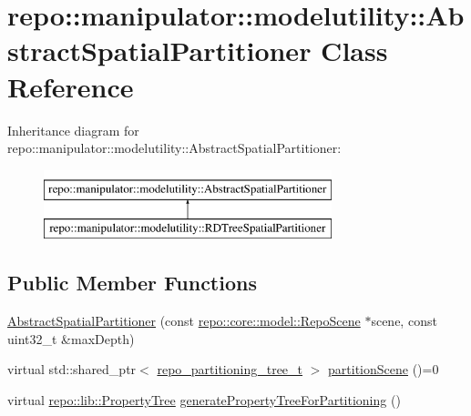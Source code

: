 \hypertarget{classrepo_1_1manipulator_1_1modelutility_1_1_abstract_spatial_partitioner}{}\section{repo\+:\+:manipulator\+:\+:modelutility\+:\+:Abstract\+Spatial\+Partitioner Class Reference}
\label{classrepo_1_1manipulator_1_1modelutility_1_1_abstract_spatial_partitioner}
Inheritance diagram for repo\+:\+:manipulator\+:\+:modelutility\+:\+:Abstract\+Spatial\+Partitioner\+:\begin{figure}[H]
\begin{center}
\leavevmode
\includegraphics[height=2.000000cm]{classrepo_1_1manipulator_1_1modelutility_1_1_abstract_spatial_partitioner}
\end{center}
\end{figure}
\subsection*{Public Member Functions}
\begin{DoxyCompactItemize}
\item 
\hyperlink{classrepo_1_1manipulator_1_1modelutility_1_1_abstract_spatial_partitioner_a9fb21ce83e682d89be17768c7b02cdf3}{Abstract\+Spatial\+Partitioner} (const \hyperlink{classrepo_1_1core_1_1model_1_1_repo_scene}{repo\+::core\+::model\+::\+Repo\+Scene} $\ast$scene, const uint32\+\_\+t \&max\+Depth)
\item 
virtual std\+::shared\+\_\+ptr$<$ \hyperlink{structrepo__partitioning__tree__t}{repo\+\_\+partitioning\+\_\+tree\+\_\+t} $>$ \hyperlink{classrepo_1_1manipulator_1_1modelutility_1_1_abstract_spatial_partitioner_af1e6e3540698ff0f4ec52cd758260aba}{partition\+Scene} ()=0
\item 
virtual \hyperlink{classrepo_1_1lib_1_1_property_tree}{repo\+::lib\+::\+Property\+Tree} \hyperlink{classrepo_1_1manipulator_1_1modelutility_1_1_abstract_spatial_partitioner_a46d182fa325b972a66b65009975e5980}{generate\+Property\+Tree\+For\+Partitioning} ()
\end{DoxyCompactItemize}
